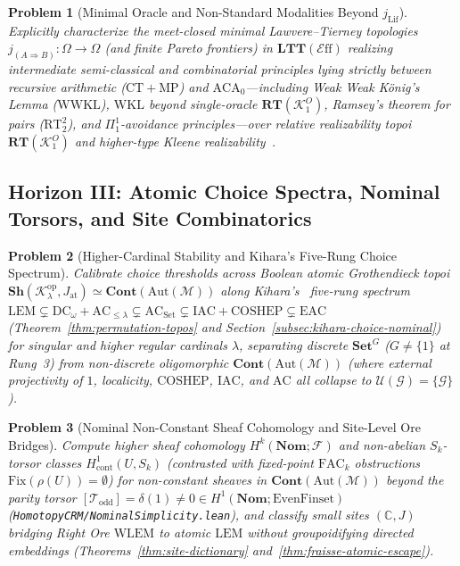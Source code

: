 \documentclass[10pt,twoside,openright]{book}
\theoremstyle{crmplain}
\newtheorem{problem}{Problem}[chapter]
\theoremstyle{crmdef}
\theoremstyle{crmremark}
\newcommand{\Eff}{\mathcal{E}\mathrm{ff}}
\begin{document}
\begin{problem}[Minimal Oracle and Non-Standard Modalities Beyond $j_{\mathrm{Lif}}$]\label{prob:open-4}
Explicitly characterize the meet-closed minimal Lawvere--Tierney topologies $j_{(A \Rightarrow B)} : \Omega \to \Omega$ (and finite Pareto frontiers) in $\mathbf{LTT}(\Eff)$ realizing intermediate semi-classical and combinatorial principles lying strictly between recursive arithmetic ($\mathrm{CT} + \mathrm{MP}$) and $\mathrm{ACA}_0$---including Weak Weak K\"onig's Lemma ($\mathrm{WWKL}$), $\mathrm{WKL}$ beyond single-oracle $\mathbf{RT}(\mathcal{K}_1^O)$, Ramsey's theorem for pairs ($\mathrm{RT}^2_2$), and $\Pi^1_1$-avoidance principles---over relative realizability topoi $\mathbf{RT}(\mathcal{K}_1^O)$ and higher-type Kleene realizability~\cite{vanOosten90}.
\end{problem}

\subsection*{Horizon III: Atomic Choice Spectra, Nominal Torsors, and Site Combinatorics}

\begin{problem}[Higher-Cardinal Stability and Kihara's Five-Rung Choice Spectrum]\label{prob:open-5}
Calibrate choice thresholds across Boolean atomic Grothendieck topoi $\mathbf{Sh}(\mathcal{K}_\lambda^{\mathrm{op}}, J_{\mathrm{at}}) \simeq \mathbf{Cont}(\mathrm{Aut}(\mathcal{M}))$ along Kihara's~\cite{Kihara26} five-rung spectrum $\mathrm{LEM} \subsetneq \mathrm{DC}_\omega + \mathrm{AC}_{\le \lambda} \subsetneq \mathrm{AC}_{\mathrm{Set}} \subsetneq \mathrm{IAC} + \mathrm{COSHEP} \subsetneq \mathrm{EAC}$ (Theorem~\ref{thm:permutation-topos} and Section~\ref{subsec:kihara-choice-nominal}) for singular and higher regular cardinals $\lambda$, separating discrete $\mathbf{Set}^G$ ($G \neq \{1\}$ at Rung~3) from non-discrete oligomorphic $\mathbf{Cont}(\mathrm{Aut}(\mathcal{M}))$ (where external projectivity of $1$, localicity, $\mathrm{COSHEP}$, $\mathrm{IAC}$, and $\mathrm{AC}$ all collapse to $\mathcal{U}(\mathcal{G}) = \{\mathcal{G}\}$).
\end{problem}

\begin{problem}[Nominal Non-Constant Sheaf Cohomology and Site-Level Ore Bridges]\label{prob:open-6}
Compute higher sheaf cohomology $H^k(\mathbf{Nom}; \mathcal{F})$ and non-abelian $S_k$-torsor classes $H^1_{\mathrm{cont}}(U, S_k)$ (contrasted with fixed-point $\mathrm{FAC}_k$ obstructions $\mathrm{Fix}(\rho(U)) = \emptyset$) for non-constant sheaves in $\mathbf{Cont}(\mathrm{Aut}(\mathcal{M}))$ beyond the parity torsor $[\mathcal{T}_{\mathrm{odd}}] = \delta(1) \neq 0 \in H^1(\mathbf{Nom}; \mathrm{EvenFinset})$ (\texttt{HomotopyCRM/\allowbreak NominalSimplicity.lean}), and classify small sites $(\mathbb{C}, J)$ bridging Right Ore $\mathrm{WLEM}$ to atomic $\mathrm{LEM}$ without groupoidifying directed embeddings (Theorems~\ref{thm:site-dictionary} and~\ref{thm:fraisse-atomic-escape}).
\end{problem}
\end{document}
